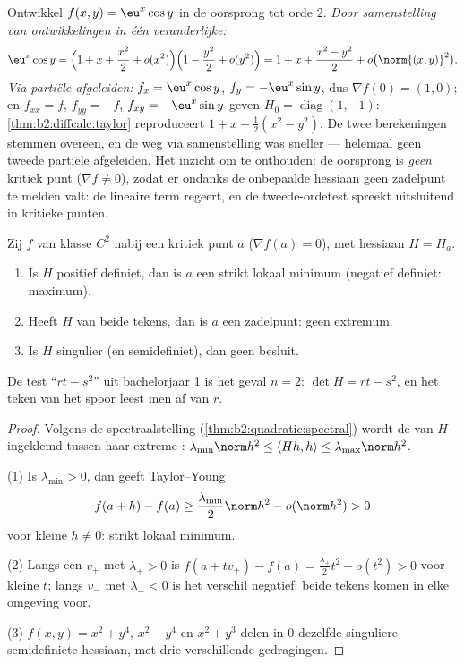 \begin{example}\label{ex:b2:diffcalc:taylortwoways}
Ontwikkel $f(x, y) = \eu^x\cos y$ in de oorsprong tot orde $2$.
\emph{Door samenstelling van ontwikkelingen in één veranderlijke:}
\[
\eu^x\cos y = \Bigl(1 + x + \frac{x^2}{2} +
o(x^2)\Bigr)\Bigl(1 - \frac{y^2}{2} + o(y^2)\Bigr)
= 1 + x + \frac{x^2 - y^2}{2} + o\bigl(\norm{(x,y)}^2\bigr) .
\]
\emph{Via partiële afgeleiden:} $f_x = \eu^x\cos y$, $f_y =
-\eu^x\sin y$, dus $\nabla f(0) = (1, 0)$; en $f_{xx} = f$,
$f_{yy} = -f$, $f_{xy} = -\eu^x\sin y$ geven $H_0 =
\operatorname{diag}(1, -1)$: \cref{thm:b2:diffcalc:taylor}
reproduceert $1 + x + \frac12(x^2 - y^2)$. De twee berekeningen
stemmen overeen, en de weg via samenstelling was sneller ---
helemaal geen tweede partiële afgeleiden. Het inzicht om te
onthouden: de oorsprong is \emph{geen} kritiek punt ($\nabla f \neq
0$), zodat er ondanks de onbepaalde hessiaan geen zadelpunt te
melden valt: de lineaire term regeert, en de tweede-ordetest
spreekt uitsluitend in kritieke punten.
\end{example}

\begin{theorem}\label{thm:b2:diffcalc:extrema}
Zij $f$ van klasse $C^2$ nabij een kritiek punt $a$ ($\nabla f(a) =
0$), met hessiaan $H = H_a$.
\begin{enumerate}
  \item Is $H$ positief definiet, dan is $a$ een strikt lokaal
        minimum (negatief definiet: maximum).
  \item Heeft $H$  van beide tekens, dan is $a$ een
        zadelpunt: geen extremum.
  \item Is $H$ singulier (en semidefiniet), dan geen besluit.
\end{enumerate}
De test ``$rt - s^2$'' uit bachelorjaar 1 is het geval $n = 2$:
$\det H = rt - s^2$, en het teken van het spoor leest men af van
$r$.
\end{theorem}

\begin{proof}
Volgens de spectraalstelling (\cref{thm:b2:quadratic:spectral})
wordt de  van $H$ ingeklemd tussen haar extreme
: $\lambda_{\min}\norm h^2 \leq \langle Hh, h\rangle
\leq \lambda_{\max}\norm h^2$.

(1) Is $\lambda_{\min} > 0$, dan geeft Taylor--Young
\[
f(a + h) - f(a) \geq \frac{\lambda_{\min}}{2}\norm h^2 -
o(\norm h^2) > 0
\]
voor kleine $h \neq 0$: strikt lokaal minimum.

(2) Langs een  $v_+$ met $\lambda_+ > 0$ is $f(a + tv_+)
- f(a) = \frac{\lambda_+}{2}t^2 + o(t^2) > 0$ voor kleine $t$;
langs $v_-$ met $\lambda_- < 0$ is het verschil negatief: beide
tekens komen in elke omgeving voor.

(3) $f(x,y) = x^2 + y^4$, $x^2 - y^4$ en $x^2 + y^3$ delen in $0$
dezelfde singuliere semidefiniete hessiaan, met drie verschillende
gedragingen.
\end{proof}

